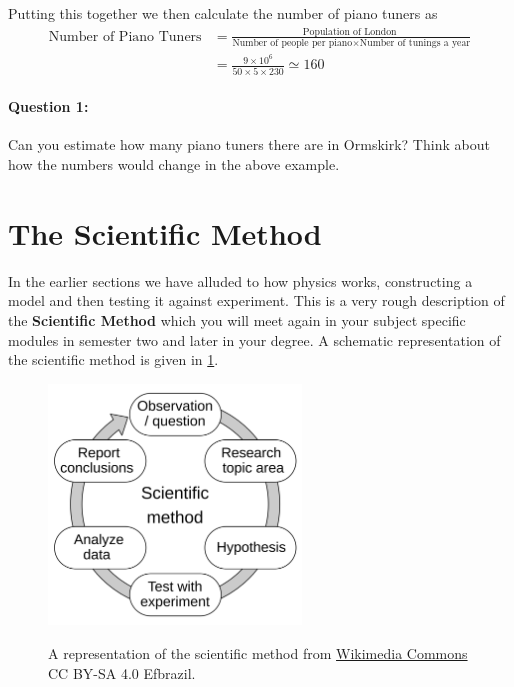 \documentclass[a4paper,12pt]{book}
\begin{document}
Putting this together we then calculate the number of piano tuners as
\begin{align*}
    \text{Number of Piano Tuners} &= \frac{\text{Population of London }}{\text{Number of people per piano} \times \text{Number of tunings a year}}\\
    &=\frac{9\times 10^{6}}{50\times 5\times 230}\simeq 160
\end{align*}

\paragraph{Question 1:}Can you estimate how many piano tuners there are in Ormskirk? Think about how the numbers would change in the above example.\\




\section{The Scientific Method}

In the earlier sections we have alluded to how physics works, constructing a model and then testing it against experiment. This is a very rough description of the \textbf{Scientific Method} which you will meet again in your subject specific modules in semester two and later in your degree. A schematic representation of the scientific method is given in \cref{fig2: scientific method}.


\begin{figure}[ht]
\centering
    \includegraphics[width=0.6\textwidth,alt={A schematic of the scientific method as a cycle, image from Wikimedia commons.}]{figures/The_Scientific_Method.png}
    \caption{A representation of the scientific method from \href{https://commons.wikimedia.org/wiki/File:The_Scientific_Method.svg}{Wikimedia Commons} CC BY-SA 4.0 Efbrazil.}
    \label{fig2: scientific method}
\end{figure}
\end{document}
